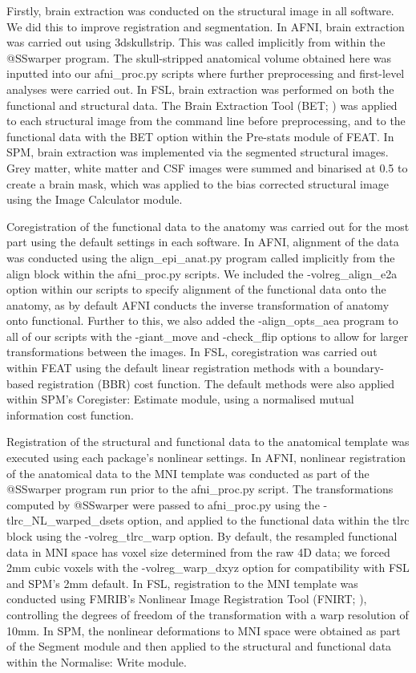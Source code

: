 Firstly, brain extraction was conducted on the structural image in all software. We did this to improve registration and segmentation. In AFNI, brain extraction was carried out using 3dskullstrip. This was called implicitly from within the @SSwarper program. The skull-stripped anatomical volume obtained here was inputted into our afni\_proc.py scripts where further preprocessing and first-level analyses were carried out.  In FSL, brain extraction was performed on both the functional and structural data. The Brain Extraction Tool (BET; \citep{Smith2002-vw}) was applied to each structural image from the command line before preprocessing, and to the functional data with the BET option within the Pre-stats module of FEAT. In SPM, brain extraction was implemented via the segmented structural images. Grey matter, white matter and CSF images were summed and binarised at 0.5 to create a brain mask, which was applied to the bias corrected structural image using the Image Calculator module. 

Coregistration of the functional data to the anatomy was carried out for the most part using the default settings in each software. In AFNI, alignment of the data was conducted using the align\_epi\_anat.py program called implicitly from the align block within the afni\_proc.py scripts. We included the -volreg\_align\_e2a option within our scripts to specify alignment of the functional data onto the anatomy, as by default AFNI conducts the inverse transformation of anatomy onto functional. Further to this, we also added the -align\_opts\_aea program to all of our scripts with the -giant\_move and -check\_flip options to allow for larger transformations between the images. In FSL, coregistration was carried out within FEAT using the default linear registration methods with a boundary-based registration (BBR) cost function. The default methods were also applied within SPM's Coregister: Estimate module, using a normalised mutual information cost function. 

Registration of the structural and functional data to the anatomical template was executed using each package's nonlinear settings. In AFNI, nonlinear registration of the anatomical data to the MNI template was conducted as part of the @SSwarper program run prior to the afni\_proc.py script. The transformations computed by @SSwarper were passed to afni\_proc.py using the -tlrc\_NL\_warped\_dsets option, and applied to the functional data within the tlrc block using the -volreg\_tlrc\_warp option. By default, the resampled functional data in MNI space has voxel size determined from the raw 4D data; we forced 2mm cubic voxels with the -volreg\_warp\_dxyz option for compatibility with FSL and SPM's 2mm default. In FSL, registration to the MNI template was conducted using FMRIB's Nonlinear Image Registration Tool (FNIRT; \citep{Andersson2007-lc}), controlling the degrees of freedom of the transformation with a warp resolution of 10mm. In SPM, the nonlinear deformations to MNI space were obtained as part of the Segment module and then applied to the structural and functional data within the Normalise: Write module. 

